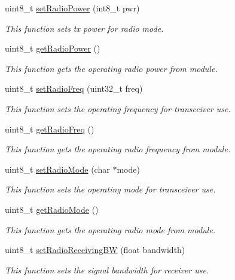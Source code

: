 \begin{DoxyCompactItemize}
uint8\+\_\+t \hyperlink{class_wasp_lo_ra_w_a_n_aa72d4cf2afad70d40f0a85ad4078f990}{set\+Radio\+Power} (int8\+\_\+t pwr)
\begin{DoxyCompactList}\small\item\em This function sets tx power for radio mode. \end{DoxyCompactList}\item 
uint8\+\_\+t \hyperlink{class_wasp_lo_ra_w_a_n_a26c4264112173c8035a3b8676b11503a}{get\+Radio\+Power} ()
\begin{DoxyCompactList}\small\item\em This function gets the operating radio power from module. \end{DoxyCompactList}\item 
uint8\+\_\+t \hyperlink{class_wasp_lo_ra_w_a_n_adea6dfc9f89ca08fe8a60843d284fcf4}{set\+Radio\+Freq} (uint32\+\_\+t freq)
\begin{DoxyCompactList}\small\item\em This function sets the operating frequency for transceiver use. \end{DoxyCompactList}\item 
uint8\+\_\+t \hyperlink{class_wasp_lo_ra_w_a_n_a4b4b5abe5f866383f4aa496e54265ca3}{get\+Radio\+Freq} ()
\begin{DoxyCompactList}\small\item\em This function gets the operating radio frequency from module. \end{DoxyCompactList}\item 
uint8\+\_\+t \hyperlink{class_wasp_lo_ra_w_a_n_afff6ba66788badd53bd093e702ba40d2}{set\+Radio\+Mode} (char $\ast$mode)
\begin{DoxyCompactList}\small\item\em This function sets the operating mode for transceiver use. \end{DoxyCompactList}\item 
uint8\+\_\+t \hyperlink{class_wasp_lo_ra_w_a_n_a1f7397691a2baac895d30d470ba409f4}{get\+Radio\+Mode} ()
\begin{DoxyCompactList}\small\item\em This function gets the operating radio mode from module. \end{DoxyCompactList}\item 
uint8\+\_\+t \hyperlink{class_wasp_lo_ra_w_a_n_a542b3a4602bfbca66ebfbf0c7404ba2a}{set\+Radio\+Receiving\+BW} (float bandwidth)
\begin{DoxyCompactList}\small\item\em This function sets the signal bandwidth for receiver use. \end{DoxyCompactList}\item 

\end{DoxyCompactItemize}
